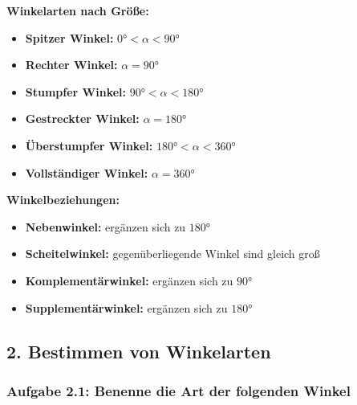 \begin{multicols}{2}
\textbf{Winkelarten nach Größe:}
\begin{itemize}
    \item \textbf{Spitzer Winkel:} $0° < \alpha < 90°$
    \item \textbf{Rechter Winkel:} $\alpha = 90°$
    \item \textbf{Stumpfer Winkel:} $90° < \alpha < 180°$
    \item \textbf{Gestreckter Winkel:} $\alpha = 180°$
    \item \textbf{Überstumpfer Winkel:} $180° < \alpha < 360°$
    \item \textbf{Vollständiger Winkel:} $\alpha = 360°$
\end{itemize}

\textbf{Winkelbeziehungen:}
\begin{itemize}
    \item \textbf{Nebenwinkel:} ergänzen sich zu $180°$
    \item \textbf{Scheitelwinkel:} gegenüberliegende Winkel sind gleich groß
    \item \textbf{Komplementärwinkel:} ergänzen sich zu $90°$
    \item \textbf{Supplementärwinkel:} ergänzen sich zu $180°$
\end{itemize}
\end{multicols}

\subsection*{2. Bestimmen von Winkelarten}

\subsubsection*{Aufgabe 2.1: Benenne die Art der folgenden Winkel}

